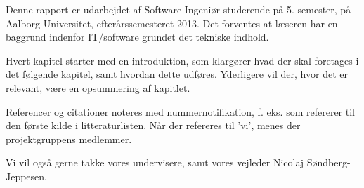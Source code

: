 Denne rapport er udarbejdet af Software-Ingeniør studerende på 5. semester, på Aalborg Universitet, efterårssemesteret 2013.
Det forventes at læseren har en baggrund indenfor IT/software grundet det tekniske indhold.

Hvert kapitel starter med en introduktion, som klargører hvad der skal foretages i det følgende kapitel, samt hvordan dette udføres.
Yderligere vil der, hvor det er relevant, være en opsummering af kapitlet.

Referencer og citationer noteres med nummernotifikation, f. eks. \cite{probabilisticRobotics} som refererer til den første kilde i litteraturlisten.
Når der refereres til 'vi', menes der projektgruppens medlemmer.

Vi vil også gerne takke vores undervisere, samt vores vejleder Nicolaj Søndberg-Jeppesen.

